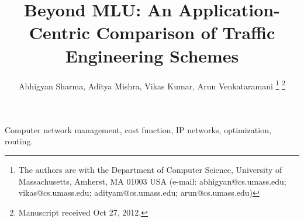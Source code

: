 \documentclass[journal]{IEEEtran}
\title{Beyond MLU: An Application-Centric Comparison of Traffic Engineering Schemes}
\date{}
\author{Abhigyan Sharma, Aditya Mishra, Vikas Kumar, Arun Venkataramani%
\thanks{The authors are with the Department of Computer Science, University of Massachusetts, Amherst, MA 01003 USA (e-mail: abhigyan@cs.umass.edu; vikas@cs.umass.edu; adityam@cs.umass.edu; arun@cs.umass.edu)}%
\thanks{Manuscript received Oct 27, 2012.}}%
\begin{document}
\maketitle



\begin{IEEEkeywords}
Computer network management,  cost function, IP networks, optimization, routing.
\end{IEEEkeywords}




%





%



%

\end{document}
